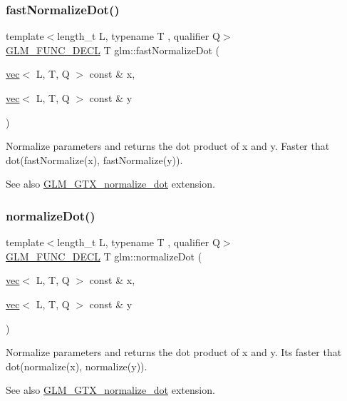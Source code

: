 \subsubsection{\texorpdfstring{fast\+Normalize\+Dot()}{fastNormalizeDot()}}
{\footnotesize\ttfamily template$<$length\+\_\+t L, typename T , qualifier Q$>$ \\
\hyperlink{setup_8hpp_ab2d052de21a70539923e9bcbf6e83a51}{G\+L\+M\+\_\+\+F\+U\+N\+C\+\_\+\+D\+E\+CL} T glm\+::fast\+Normalize\+Dot (\begin{DoxyParamCaption}\item[{\hyperlink{structglm_1_1vec}{vec}$<$ L, T, Q $>$ const \&}]{x,  }\item[{\hyperlink{structglm_1_1vec}{vec}$<$ L, T, Q $>$ const \&}]{y }\end{DoxyParamCaption})}

Normalize parameters and returns the dot product of x and y. Faster that dot(fast\+Normalize(x), fast\+Normalize(y)).

\begin{DoxySeeAlso}{See also}
\hyperlink{group__gtx__normalize__dot}{G\+L\+M\+\_\+\+G\+T\+X\+\_\+normalize\+\_\+dot} extension. 
\end{DoxySeeAlso}
\mbox{\label{group__gtx__normalize__dot_gacb140a2b903115d318c8b0a2fb5a5daa}} 
\subsubsection{\texorpdfstring{normalize\+Dot()}{normalizeDot()}}
{\footnotesize\ttfamily template$<$length\+\_\+t L, typename T , qualifier Q$>$ \\
\hyperlink{setup_8hpp_ab2d052de21a70539923e9bcbf6e83a51}{G\+L\+M\+\_\+\+F\+U\+N\+C\+\_\+\+D\+E\+CL} T glm\+::normalize\+Dot (\begin{DoxyParamCaption}\item[{\hyperlink{structglm_1_1vec}{vec}$<$ L, T, Q $>$ const \&}]{x,  }\item[{\hyperlink{structglm_1_1vec}{vec}$<$ L, T, Q $>$ const \&}]{y }\end{DoxyParamCaption})}

Normalize parameters and returns the dot product of x and y. It\textquotesingle{}s faster that dot(normalize(x), normalize(y)).

\begin{DoxySeeAlso}{See also}
\hyperlink{group__gtx__normalize__dot}{G\+L\+M\+\_\+\+G\+T\+X\+\_\+normalize\+\_\+dot} extension. 
\end{DoxySeeAlso}
